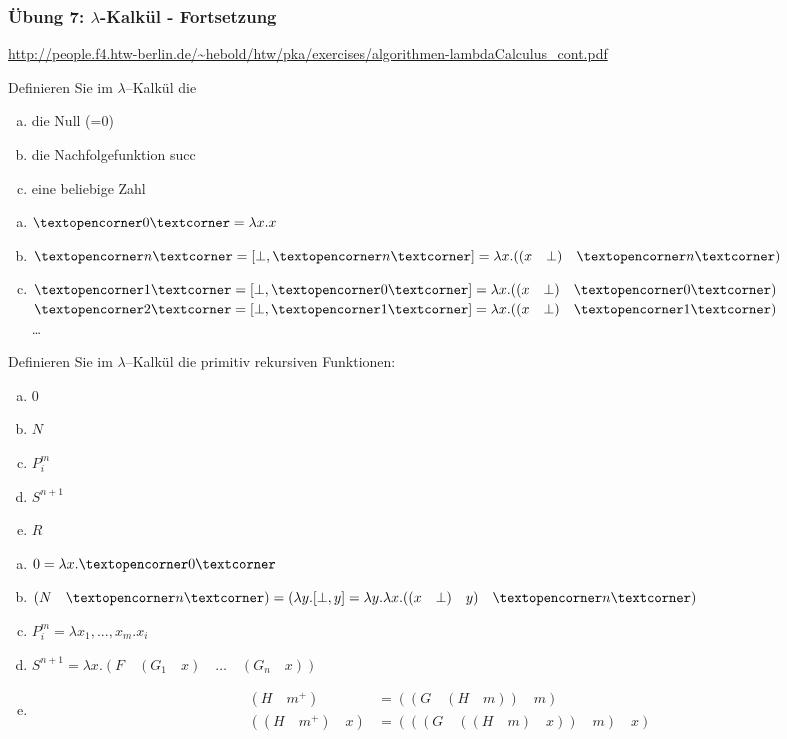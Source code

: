 \begin{card}
	\frametitle{Übung 7: $\lambda$-Kalkül - Fortsetzung}
	\url{http://people.f4.htw-berlin.de/~hebold/htw/pka/exercises/algorithmen-lambdaCalculus_cont.pdf}
\end{card}

\begin{card}
	Definieren Sie im $\lambda$–Kalkül die
	\begin{enumerate}[a)]
    \item die Null (=0)
    \item die Nachfolgefunktion succ
    \item eine beliebige Zahl
	\end{enumerate}
	\hr
	\begin{enumerate}[a)]
    \item $\lambdanumber{0} = \lambda x.x$
    \item $\lambdanumber{n} = [\bot, \lambdanumber{n}] = \lambda x.((x \quad \bot) \quad \lambdanumber{n})$
    \item $\lambdanumber{1} = [\bot, \lambdanumber{0}] = \lambda x.((x \quad \bot) \quad \lambdanumber{0})$\\
          $\lambdanumber{2} = [\bot, \lambdanumber{1}] = \lambda x.((x \quad \bot) \quad \lambdanumber{1})$\\
        \dots
	\end{enumerate}
\end{card}

\begin{card}
	Definieren Sie im $\lambda$–Kalkül die primitiv rekursiven Funktionen:
	\begin{enumerate}[a)]
    \item $0$
    \item $N$
    \item $P^m_i$
    \item $S^{n+1}$
    \item $R$
	\end{enumerate}
	\hr
	\begin{enumerate}[a)]
    \item $0 = \lambda x.\lambdanumber{0}$
    \item $(N \quad \lambdanumber{n}) = (\lambda y.[\bot, y] = \lambda y.\lambda x.((x \quad \bot) \quad y) \quad \lambdanumber{n})$\\
    \item $P^m_i = \lambda x_1,...,x_m.x_i$
    \item $S^{n+1} = \lambda x.(F \quad (G_1 \quad x) \quad \ldots \quad (G_n \quad x))$
    \item
      \begin{align*}
        (H \quad m^+) &= ((G \quad (H \quad m)) \quad m) \\
        ((H \quad m^+) \quad x) &= (((G \quad ((H \quad m) \quad x)) \quad m) \quad x)
      \end{align*}
	\end{enumerate}
\end{card}

